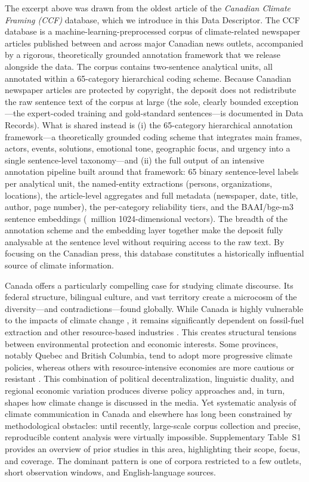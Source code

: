 \documentclass[12pt]{article}
\renewcommand\_{\texttt{\detokenize{_}\allowbreak}}
\begin{document}
The excerpt above was drawn from the oldest article of the \emph{Canadian Climate Framing (CCF)} database, which we introduce in this Data Descriptor. The CCF database is a machine-learning-preprocessed corpus of \CCFarticles{} climate-related newspaper articles published between \CCFyearfirst{} and \CCFyearlast{} across \CCFnewspapers{} major Canadian news outlets, accompanied by a rigorous, theoretically grounded annotation framework that we release alongside the data. The corpus contains \CCFsentences{} two-sentence analytical units, all annotated within a 65-category hierarchical coding scheme. Because Canadian newspaper articles are protected by copyright, the deposit does not redistribute the raw sentence text of the corpus at large (the sole, clearly bounded exception---the expert-coded training and gold-standard sentences---is documented in Data Records). What is shared instead is (i) the 65-category hierarchical annotation framework---a theoretically grounded coding scheme that integrates main frames, actors, events, solutions, emotional tone, geographic focus, and urgency into a single sentence-level taxonomy---and (ii) the full output of an intensive annotation pipeline built around that framework: 65 binary sentence-level labels per analytical unit, the named-entity extractions (persons, organizations, locations), the article-level aggregates and full metadata (newspaper, date, title, author, page number), the per-category reliability tiers, and the BAAI/bge-m3 sentence embeddings (\CCFembedApprox{}~million 1024-dimensional vectors). The breadth of the annotation scheme and the embedding layer together make the deposit fully analysable at the sentence level without requiring access to the raw text. By focusing on the Canadian press, this database constitutes a historically influential source of climate information.

Canada offers a particularly compelling case for studying climate discourse. Its federal structure, bilingual culture, and vast territory create a microcosm of the diversity---and contradictions---found globally. While Canada is highly vulnerable to the impacts of climate change \autocite{lulham_canada_2023}, it remains significantly dependent on fossil-fuel extraction and other resource-based industries \autocite{natural_resources_canada_energy_2025}. This creates structural tensions between environmental protection and economic interests. Some provinces, notably Quebec and British Columbia, tend to adopt more progressive climate policies, whereas others with resource-intensive economies are more cautious or resistant \autocite{harrison_struggle_2010}. This combination of political decentralization, linguistic duality, and regional economic variation produces diverse policy approaches and, in turn, shapes how climate change is discussed in the media. Yet systematic analysis of climate communication in Canada and elsewhere has long been constrained by methodological obstacles: until recently, large-scale corpus collection and precise, reproducible content analysis were virtually impossible. Supplementary Table~S1 provides an overview of prior studies in this area, highlighting their scope, focus, and coverage. The dominant pattern is one of corpora restricted to a few outlets, short observation windows, and English-language sources.
\end{document}
